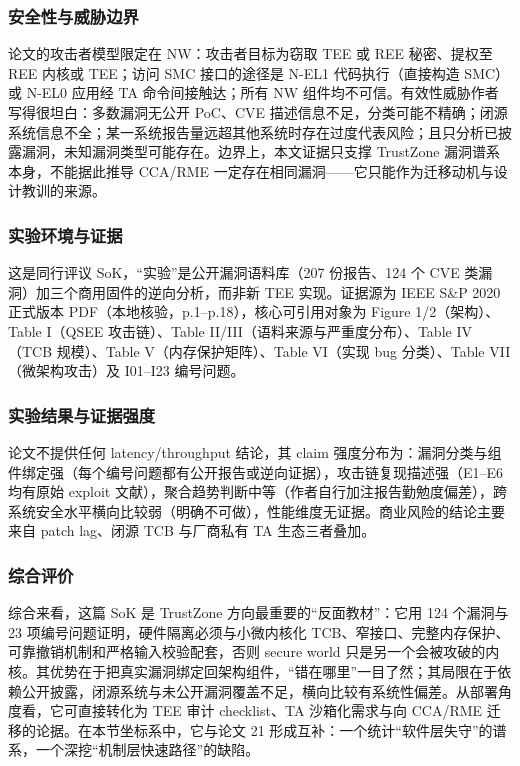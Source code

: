 \documentclass[11pt]{ctexart}
\begin{document}
\subsubsection{安全性与威胁边界}
论文的攻击者模型限定在 NW：攻击者目标为窃取 TEE 或 REE 秘密、提权至 REE 内核或 TEE；访问 SMC 接口的途径是 N-EL1 代码执行（直接构造 SMC）或 N-EL0 应用经 TA 命令间接触达；所有 NW 组件均不可信。有效性威胁作者写得很坦白：多数漏洞无公开 PoC、CVE 描述信息不足，分类可能不精确；闭源系统信息不全；某一系统报告量远超其他系统时存在过度代表风险；且只分析已披露漏洞，未知漏洞类型可能存在。边界上，本文证据只支撑 TrustZone 漏洞谱系本身，不能据此推导 CCA/RME 一定存在相同漏洞——它只能作为迁移动机与设计教训的来源。\par
\subsubsection{实验环境与证据}
这是同行评议 SoK，``实验''是公开漏洞语料库（207 份报告、124 个 CVE 类漏洞）加三个商用固件的逆向分析，而非新 TEE 实现。证据源为 IEEE S\&P 2020 正式版本 PDF（本地核验，p.1--p.18），核心可引用对象为 Figure 1/2（架构）、Table I（QSEE 攻击链）、Table II/III（语料来源与严重度分布）、Table IV（TCB 规模）、Table V（内存保护矩阵）、Table VI（实现 bug 分类）、Table VII（微架构攻击）及 I01--I23 编号问题。\par
\subsubsection{实验结果与证据强度}
论文不提供任何 latency/throughput 结论，其 claim 强度分布为：漏洞分类与组件绑定强（每个编号问题都有公开报告或逆向证据），攻击链复现描述强（E1--E6 均有原始 exploit 文献），聚合趋势判断中等（作者自行加注报告勤勉度偏差），跨系统安全水平横向比较弱（明确不可做），性能维度无证据。商业风险的结论主要来自 patch lag、闭源 TCB 与厂商私有 TA 生态三者叠加。\par
\subsubsection{综合评价}
综合来看，这篇 SoK 是 TrustZone 方向最重要的``反面教材''：它用 124 个漏洞与 23 项编号问题证明，硬件隔离必须与小微内核化 TCB、窄接口、完整内存保护、可靠撤销机制和严格输入校验配套，否则 secure world 只是另一个会被攻破的内核。其优势在于把真实漏洞绑定回架构组件，``错在哪里''一目了然；其局限在于依赖公开披露，闭源系统与未公开漏洞覆盖不足，横向比较有系统性偏差。从部署角度看，它可直接转化为 TEE 审计 checklist、TA 沙箱化需求与向 CCA/RME 迁移的论据。在本节坐标系中，它与论文 21 形成互补：一个统计``软件层失守''的谱系，一个深挖``机制层快速路径''的缺陷。\par
\end{document}
